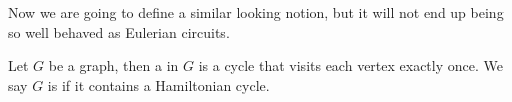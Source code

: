 Now we are going to define a similar looking notion, but it will not end up being so well behaved as Eulerian circuits. 

\begin{definition}
	Let $G$ be a graph, then a  in $G$ is a cycle that visits each vertex exactly once. We say $G$ is  if it contains a Hamiltonian cycle.
\end{definition}

\begin{center}
	


\begin{tikzpicture}[x=0.75pt,y=0.75pt,yscale=-1,xscale=1]


\end{tikzpicture}
\end{center}

